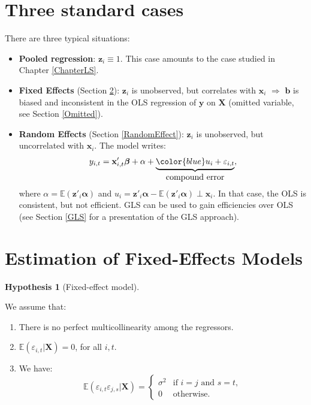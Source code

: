 \documentclass[
  12pt,
]{book}
\providecommand{\tightlist}{%
  \setlength{\itemsep}{0pt}\setlength{\parskip}{0pt}}
\theoremstyle{definition}
\theoremstyle{definition}
\theoremstyle{definition}
\theoremstyle{definition}
\newtheorem{hypothesis}{Hypothesis}[chapter]
\theoremstyle{remark}
\begin{document}
\hypertarget{three-standard-cases}{%
\section{Three standard cases}\label{three-standard-cases}}

There are three typical situations:

\begin{itemize}
\tightlist
\item
  \textbf{Pooled regression}: \(\mathbf{z}_i \equiv 1\). This case amounts to the case studied in Chapter \ref{ChapterLS}.
\item
  \textbf{Fixed Effects} (Section \ref{FixedEffect}): \(\mathbf{z}_i\) is unobserved, but correlates with \(\mathbf{x}_i\) \(\Rightarrow\) \(\mathbf{b}\) is biased and inconsistent in the OLS regression of \(\mathbf{y}\) on \(\mathbf{X}\) (omitted variable, see Section \ref{Omitted}).
\item
  \textbf{Random Effects} (Section \ref{RandomEffect}): \(\mathbf{z}_i\) is unobserved, but uncorrelated with \(\mathbf{x}_i\). The model writes:
  \[
  y_{i,t} = \mathbf{x}'_{i,t}\boldsymbol\beta + \alpha +  \underbrace{{\color{blue}u_i + \varepsilon_{i,t}}}_{\mbox{compound error}},
  \]
  where \(\alpha = \mathbb{E}(\mathbf{z}'_{i}\boldsymbol\alpha)\) and \(u_i = \mathbf{z}'_{i}\boldsymbol\alpha - \mathbb{E}(\mathbf{z}'_{i}\boldsymbol\alpha) \perp \mathbf{x}_i\). In that case, the OLS is consistent, but not efficient. GLS can be used to gain efficiencies over OLS (see Section \ref{GLS} for a presentation of the GLS approach).
\end{itemize}

\hypertarget{FixedEffect}{%
\section{Estimation of Fixed-Effects Models}\label{FixedEffect}}

\begin{hypothesis}[Fixed-effect model]
\protect\hypertarget{hyp:FE}{}\label{hyp:FE}

We assume that:

\begin{enumerate}
\def\labelenumi{\roman{enumi}.}
\tightlist
\item
  There is no perfect multicollinearity among the regressors.
\item
  \(\mathbb{E}(\varepsilon_{i,t}|\mathbf{X})=0\), for all \(i,t\).
\item
  We have:
  \[
  \mathbb{E}(\varepsilon_{i,t}\varepsilon_{j,s}|\mathbf{X}) =
  \left\{
  \begin{array}{cl}
  \sigma^2 & \mbox{if $i=j$ and $s=t$},\\
  0 & \mbox{otherwise.}
  \end{array}\right.
  \]
\end{enumerate}

\end{hypothesis}
\end{document}
